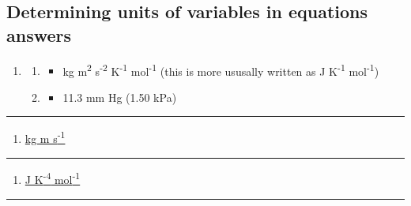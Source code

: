 \documentclass[
]{book}
\providecommand{\tightlist}{%
  \setlength{\itemsep}{0pt}\setlength{\parskip}{0pt}}
\begin{document}
\hypertarget{subsec:detunitsans}{%
\subsection{Determining units of variables in equations answers}\label{subsec:detunitsans}}

\begin{enumerate}
\def\labelenumi{\arabic{enumi}.}
\item
  \begin{enumerate}
  \def\labelenumii{\alph{enumii}.}
  \item
    \begin{itemize}
    \tightlist
    \item
      kg m\textsuperscript{2} s\textsuperscript{-2} K\textsuperscript{-1} mol\textsuperscript{-1} (this is more ususally written as J K\textsuperscript{-1} mol\textsuperscript{-1})
    \end{itemize}
  \item
    \begin{itemize}
    \tightlist
    \item
      11.3 mm Hg (1.50 kPa)
    \end{itemize}
  \end{enumerate}
\end{enumerate}

\begin{center}\rule{0.5\linewidth}{0.5pt}\end{center}

\begin{enumerate}
\def\labelenumi{\arabic{enumi}.}
\setcounter{enumi}{1}
\tightlist
\item
  \href{https://www.youtube.com/embed/3cuSZZF3Z4Y}{kg m s\textsuperscript{-1}}
\end{enumerate}

\begin{center}\rule{0.5\linewidth}{0.5pt}\end{center}

\begin{enumerate}
\def\labelenumi{\arabic{enumi}.}
\setcounter{enumi}{2}
\tightlist
\item
  \href{https://www.youtube.com/embed/SECV4uuki3s}{J K\textsuperscript{-4} mol\textsuperscript{-1}}
\end{enumerate}

\begin{center}\rule{0.5\linewidth}{0.5pt}\end{center}
\end{document}
